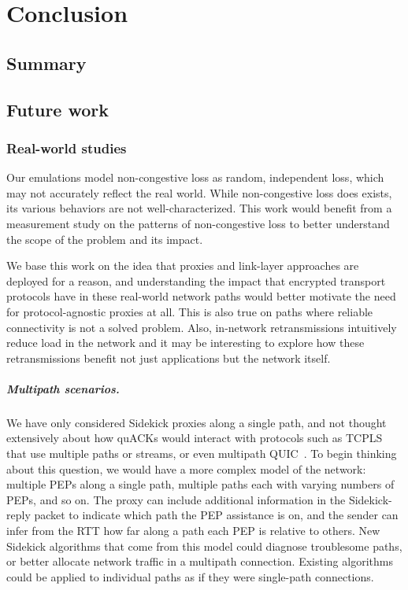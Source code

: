 \chapter{Conclusion}
\label{sec:conclusion}

\section{Summary}
\label{sec:conclusion:summary}

\section{Future work}
\label{sec:conclusion:future}

\subsection{Real-world studies}
\label{sec:conclusion:future:real-studies}

Our emulations model non-congestive loss as random, independent loss,
which may not accurately reflect the real world. While non-congestive loss
does exists, its various behaviors are not well-characterized. This work
would benefit from a measurement study on the patterns of non-congestive loss
to better understand the scope of the problem and its impact.

We base this work on the idea that proxies and link-layer approaches are
deployed for a reason, and understanding the impact that encrypted transport
protocols have in these real-world network paths would better motivate the need
for protocol-agnostic proxies at all. This is also true on paths where
reliable connectivity is not a solved problem. Also,
in-network retransmissions intuitively reduce load in the network and it may be
interesting to explore how these retransmissions benefit not just
applications but the network itself.

\paragraph{Multipath scenarios.}
We have only considered Sidekick proxies along a single path, and not thought
extensively about how quACKs would interact with protocols such as
\mbox{TCPLS}~\cite{rochet2020tcpls} that use multiple paths or streams,
or even multipath QUIC~\cite{de2017multipath}.
To begin thinking about this question, we would have a more complex model of
the network: multiple PEPs along a single path, multiple paths each with varying
numbers of PEPs, and so on. The proxy can include
additional information in the Sidekick-reply packet to indicate which path the
PEP assistance is on, and the sender can infer from the RTT how far along a path each PEP
is relative to others. New Sidekick algorithms that come from this model could
diagnose troublesome paths, or better allocate network traffic in a multipath
connection. Existing algorithms could be applied to individual paths as if they
were single-path connections.

